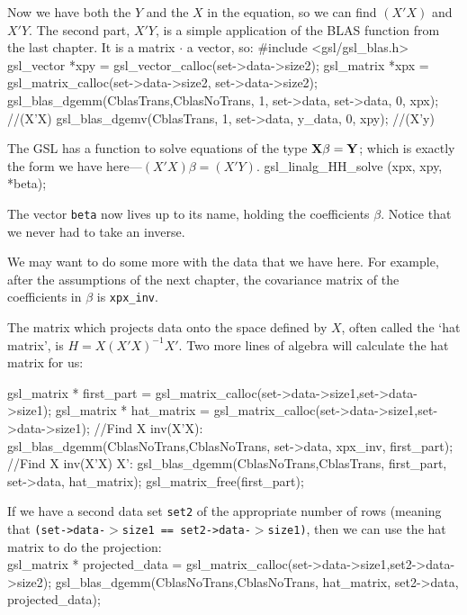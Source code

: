 Now we have both the $Y$ and the $X$ in the equation, so we can find $(X'X)$ and $X'Y$.
The second part, $X'Y$, is a simple application of the BLAS function from the last chapter. It is a
matrix $\cdot$ a vector, so:
#include <gsl/gsl_blas.h>
gsl_vector      *xpy            = gsl_vector_calloc(set->data->size2);
gsl_matrix      *xpx            = gsl_matrix_calloc(set->data->size2, set->data->size2);
        gsl_blas_dgemm(CblasTrans,CblasNoTrans, 1, set->data, set->data, 0, xpx); //(X'X)
        gsl_blas_dgemv(CblasTrans, 1, set->data, y_data, 0, xpy); //(X'y)

The GSL has a function to solve equations of the type ${\bf X} \beta =
{\bf Y}$; which is exactly the form we have here---$(X'X)\beta = (X'Y)$.  \label{ols}
        gsl_linalg_HH_solve (xpx, xpy, *beta);

The vector {\tt beta} now lives up to its name, holding the coefficients
$\beta$. Notice that we never had to take an inverse.  

We may want to do some more with the data that we have here. For example,
after the assumptions of the next chapter, the covariance matrix of the
coefficients in $\beta$ is {\tt xpx\_inv}.

The matrix which projects data onto the space defined by $X$, often
called the `hat matrix', is $H = X(X'X)^{-1}X'$. Two more lines of algebra will calculate the hat matrix
for us:

gsl_matrix * first_part = gsl_matrix_calloc(set->data->size1,set->data->size1);
gsl_matrix * hat_matrix = gsl_matrix_calloc(set->data->size1,set->data->size1);
//Find X inv(X'X):
gsl_blas_dgemm(CblasNoTrans,CblasNoTrans, set->data, xpx_inv, first_part);	
//Find X inv(X'X) X':
gsl_blas_dgemm(CblasNoTrans,CblasTrans, first_part, set->data, hat_matrix);	
gsl_matrix_free(first_part);

If we have a second data set {\tt set2} of the appropriate number of
rows (meaning that {\tt (set->data-$>$size1 == set2->data-$>$size1)}, then we can use the hat matrix to do the projection:\\
gsl_matrix * projected_data = gsl_matrix_calloc(set->data->size1,set2->data->size2);
gsl_blas_dgemm(CblasNoTrans,CblasNoTrans, hat_matrix, set2->data, projected_data);






